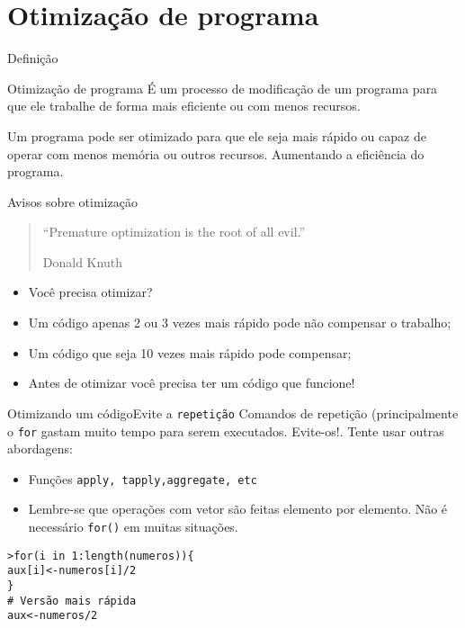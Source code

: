 \documentclass[handout]{beamer}
\begin{document}
\section{Otimização de programa}

\begin{frame}{Definição}
  \begin{block}{Otimização de programa}
É um processo de modificação de um programa para que ele trabalhe de forma mais eficiente ou com menos recursos.     
  \end{block}
\pause
Um programa pode ser otimizado para que ele seja mais rápido ou capaz de operar com menos memória ou outros recursos. Aumentando a eficiência do programa.
  
\end{frame}
\begin{frame}{Avisos sobre otimização}
  \begin{quote}
    ``Premature optimization is the root of all evil.'' \\
    \begin{flushright}
      Donald Knuth
    \end{flushright}
  \end{quote}

  \begin{itemize}[<+->]
  \item Você precisa otimizar?
  \item Um código apenas 2 ou 3 vezes mais rápido pode não compensar o trabalho;
  \item Um código que seja 10 vezes mais rápido pode compensar;
  \item Antes de otimizar você precisa ter um código que funcione!
  \end{itemize}  
\end{frame}
\begin{frame}{Otimizando um código}{Evite a \texttt{repetição}}
Comandos de repetição (principalmente o \texttt{for} gastam muito tempo para serem executados. Evite-os!. Tente usar outras abordagens:
\begin{itemize}
\item Funções \texttt{apply, tapply,aggregate, etc}
\item Lembre-se que operações com vetor são feitas elemento por elemento. Não é necessário \texttt{for()} em muitas situações.
\end{itemize}
\texttt{>for(i in 1:length(numeros))\{\\
\hspace{10pt} aux[i]<-numeros[i]/2\\
\} \\ \vspace{10pt}
\# Versão mais rápida\\
aux<-numeros/2}
 
\end{frame}
\end{document}
